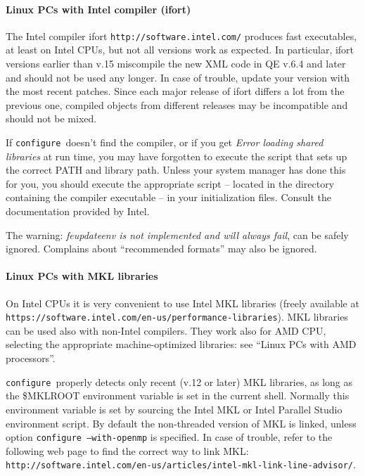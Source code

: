 \documentclass[12pt,a4paper]{article}
\def\configure{\texttt{configure}}
\begin{document}
\paragraph{Linux PCs with Intel compiler (ifort)}

The Intel compiler ifort \texttt{http://software.intel.com/}
produces fast executables, at least on Intel CPUs, but not all versions
work as expected. In particular, ifort versions earlier than v.15
miscompile the new XML code in QE v.6.4 and later and should not be
used any longer. In case of trouble, update your version
with the most recent patches. Since each major release of ifort
differs a lot from the previous one, compiled objects from different
releases may be incompatible and should not be mixed.

If \configure\ doesn't find the compiler, or if you get
{\em Error loading shared libraries} at run time, you may have
forgotten to execute the script that
sets up the correct PATH and library path. Unless your system manager has
done this for you, you should execute the appropriate script -- located in
the directory containing the compiler executable -- in your
initialization files. Consult the documentation provided by Intel.

The warning: {\em feupdateenv is not implemented and will always fail},
can be safely ignored. Complains about ``recommended formats'' may also
be ignored.

\paragraph{Linux PCs with MKL libraries}
On Intel CPUs it is very convenient to use Intel MKL libraries
(freely available at
\texttt{https://software.intel.com/en-us/performance-libraries}).
MKL libraries can be used also with non-Intel compilers.
They work also for AMD CPU, selecting the appropriate machine-optimized
libraries: see ``Linux PCs with AMD processors''.

\configure\ properly detects only recent (v.12 or later) MKL libraries,
as long as the \$MKLROOT environment variable is set in the current shell.
Normally this environment variable is set by sourcing the Intel MKL or Intel
Parallel Studio environment script.
By default the non-threaded version of MKL is linked, unless option
\texttt{configure --with-openmp} is specified. In case of trouble,
refer to the following web page to find the correct way to link MKL:\\
\texttt{http://software.intel.com/en-us/articles/intel-mkl-link-line-advisor/}.
\end{document}
